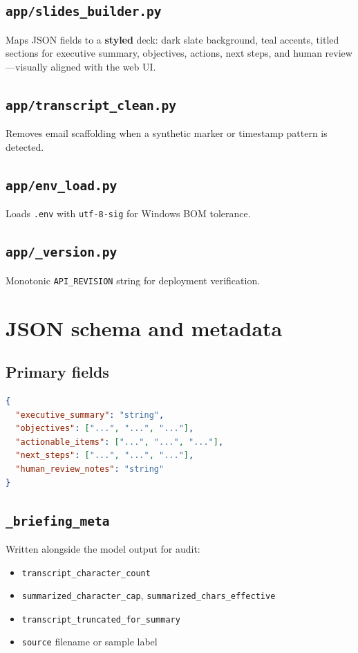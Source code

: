 \documentclass[11pt,a4paper]{article}
\begin{document}
\subsection{\texttt{app/slides\_builder.py}}
Maps JSON fields to a \textbf{styled} deck: dark slate background, teal accents, titled sections for executive summary, objectives, actions, next steps, and human review---visually aligned with the web UI.

\subsection{\texttt{app/transcript\_clean.py}}
Removes email scaffolding when a synthetic marker or timestamp pattern is detected.

\subsection{\texttt{app/env\_load.py}}
Loads \texttt{.env} with \texttt{utf-8-sig} for Windows BOM tolerance.

\subsection{\texttt{app/\_version.py}}
Monotonic \texttt{API\_REVISION} string for deployment verification.

\section{JSON schema and metadata}

\subsection{Primary fields}
\begin{lstlisting}[language=json]
{
  "executive_summary": "string",
  "objectives": ["...", "...", "..."],
  "actionable_items": ["...", "...", "..."],
  "next_steps": ["...", "...", "..."],
  "human_review_notes": "string"
}
\end{lstlisting}

\subsection{\texttt{\_briefing\_meta}}
Written alongside the model output for audit:
\begin{itemize}
  \item \texttt{transcript\_character\_count}
  \item \texttt{summarized\_character\_cap}, \texttt{summarized\_chars\_effective}
  \item \texttt{transcript\_truncated\_for\_summary}
  \item \texttt{source} filename or sample label
\end{itemize}
\end{document}
